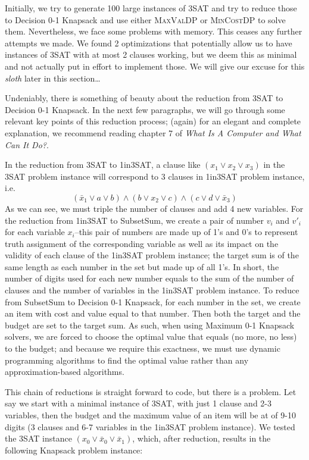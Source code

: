 \documentclass[12pt, oneside]{book}
\begin{document}
Initially, we try to generate 100 large instances of 3SAT and try to
reduce those to Decision 0-1 Knapsack and use either \textsc{MaxValDP}
or \textsc{MinCostDP} to solve them. Nevertheless, we face some problems
with memory. This ceases any further attempts we made. We found 2
optimizations that potentially allow us to have instances of 3SAT with
at most 2 clauses working, but we deem this as minimal and not actually
put in effort to implement those. We will give our excuse for this
\emph{sloth} later in this section\ldots{}

Undeniably, there is something of beauty about the reduction from 3SAT
to Decision 0-1 Knapsack. In the next few paragraphs, we will go through
some relevant key points of this reduction process; (again) for an
elegant and complete explanation, we recommend reading chapter 7 of
\emph{What Is A Computer and What Can It Do?}.

In the reduction from 3SAT to 1in3SAT, a clause like
\((x_1 \lor x_2 \lor x_3)\) in the 3SAT problem instance will correspond
to 3 clauses in 1in3SAT problem instance, i.e.
\[(\bar{x}_1 \lor a \lor b)\land (b \lor x_2 \lor c)\land (c \lor d \lor \bar{x}_3)\]
As we can see, we must triple the number of clauses and add 4 new
variables. For the reduction from 1in3SAT to SubsetSum, we create a pair
of number \(v_i\) and \(v'_i\) for each variable \(x_i\)--this pair of
numbers are made up of 1's and 0's to represent truth assignment of the
corresponding variable as well as its impact on the validity of each
clause of the 1in3SAT problem instance; the target sum is of the same
length as each number in the set but made up of all 1's. In short, the
number of digits used for each new number equals to the sum of the
number of clauses and the number of variables in the 1in3SAT problem
instance. To reduce from SubsetSum to Decision 0-1 Knapsack, for each
number in the set, we create an item with cost and value equal to that
number. Then both the target and the budget are set to the target sum.
As such, when using Maximum 0-1 Knapsack solvers, we are forced to
choose the optimal value that equals (no more, no less) to the budget;
and because we require this exactness, we must use dynamic programming
algorithms to find the optimal value rather than any approximation-based
algorithms.

This chain of reductions is straight forward to code, but there is a
problem. Let say we start with a minimal instance of 3SAT, with just 1
clause and 2-3 variables, then the budget and the maximum value of an
item will be at of 9-10 digits (3 clauses and 6-7 variables in the
1in3SAT problem instance). We tested the 3SAT instance
\((x_{0} \lor \bar{x}_{0} \lor \bar{x}_{1})\), which, after reduction,
results in the following Knapsack problem instance:
\end{document}
